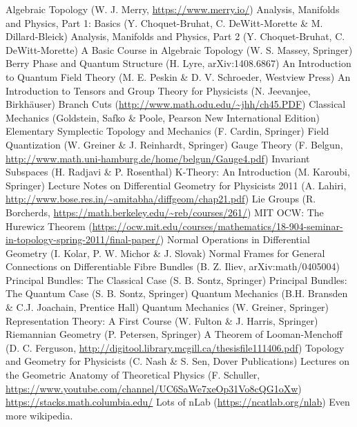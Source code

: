 \documentclass[11pt, a4paper]{report}
\begin{document}
\begin{thebibliography}{99}
	Algebraic Topology (W. J. Merry, \url{https://www.merry.io/})
	Analysis, Manifolds and Physics, Part 1: Basics (Y. Choquet-Bruhat, C. DeWitt-Morette \& M. Dillard-Bleick)
	Analysis, Manifolds and Physics, Part 2 (Y. Choquet-Bruhat, C. DeWitt-Morette)
	A Basic Course in Algebraic Topology (W. S. Massey, Springer)
	Berry Phase and Quantum Structure (H. Lyre, arXiv:1408.6867)
	An Introduction to Quantum Field Theory (M. E. Peskin \& D. V. Schroeder, Westview Press)
    	An Introduction to Tensors and Group Theory for Physicists (N. Jeevanjee, Birkh\"auser)
    	Branch Cuts (\url{http://www.math.odu.edu/~jhh/ch45.PDF})
	Classical Mechanics (Goldstein, Safko \& Poole, Pearson New International Edition)
	Elementary Symplectic Topology and Mechanics (F. Cardin, Springer)
	Field Quantization (W. Greiner \& J. Reinhardt, Springer)
	Gauge Theory (F. Belgun, \url{http://www.math.uni-hamburg.de/home/belgun/Gauge4.pdf})
	Invariant Subspaces (H. Radjavi \& P. Rosenthal)
	K-Theory: An Introduction (M. Karoubi, Springer)
	Lecture Notes on Differential Geometry for Physicists 2011 (A. Lahiri, \url{http://www.bose.res.in/~amitabha/diffgeom/chap21.pdf})
	Lie Groups (R. Borcherds, \url{https://math.berkeley.edu/~reb/courses/261/})
	MIT OCW: The Hurewicz Theorem (\url{https://ocw.mit.edu/courses/mathematics/18-904-seminar-in-topology-spring-2011/final-paper/})
	Normal Operations in Differential Geometry (I. Kolar, P. W. Michor \& J. Slovak)
	Normal Frames for General Connections on Differentiable Fibre Bundles (B. Z. Iliev, arXiv:math/0405004)
	Principal Bundles: The Classical Case (S. B. Sontz, Springer)
	Principal Bundles: The Quantum Case (S. B. Sontz, Springer)
    	Quantum Mechanics (B.H. Bransden \& C.J. Joachain, Prentice Hall)
    	Quantum Mechanics (W. Greiner, Springer)
	Representation Theory: A First Course (W. Fulton \& J. Harris, Springer)
	Riemannian Geometry (P. Petersen, Springer)
	A Theorem of Looman-Menchoff (D. C. Ferguson, \url{http://digitool.library.mcgill.ca/thesisfile111406.pdf})
	Topology and Geometry for Physicists (C. Nash \& S. Sen, Dover Publications)
	Lectures on the Geometric Anatomy of Theoretical Physics (F. Schuller, \url{https://www.youtube.com/channel/UC6SaWe7xeOp31Vo8cQG1oXw})
	\url{https://stacks.math.columbia.edu/}
	Lots of nLab (\url{https://ncatlab.org/nlab})
	Even more wikipedia.
\end{thebibliography}
\printindex
\end{document}
